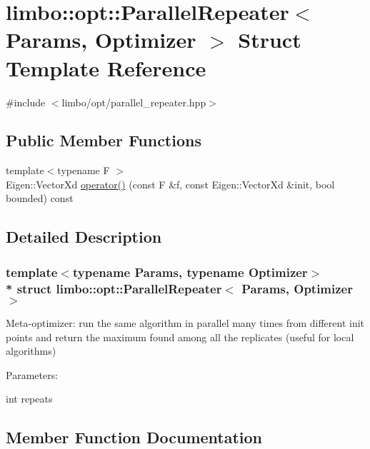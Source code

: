 \hypertarget{structlimbo_1_1opt_1_1_parallel_repeater}{}\section{limbo\+:\+:opt\+:\+:Parallel\+Repeater$<$ Params, Optimizer $>$ Struct Template Reference}
\label{structlimbo_1_1opt_1_1_parallel_repeater}


{\ttfamily \#include $<$limbo/opt/parallel\+\_\+repeater.\+hpp$>$}

\subsection*{Public Member Functions}
\begin{DoxyCompactItemize}
\item 
{\footnotesize template$<$typename F $>$ }\\Eigen\+::\+Vector\+Xd \hyperlink{structlimbo_1_1opt_1_1_parallel_repeater_ac50bb2fc1525495c2025f0ff1c0cb021}{operator()} (const F \&f, const Eigen\+::\+Vector\+Xd \&init, bool bounded) const 
\end{DoxyCompactItemize}


\subsection{Detailed Description}
\subsubsection*{template$<$typename Params, typename Optimizer$>$\\*
struct limbo\+::opt\+::\+Parallel\+Repeater$<$ Params, Optimizer $>$}

Meta-\/optimizer\+: run the same algorithm in parallel many times from different init points and return the maximum found among all the replicates (useful for local algorithms)

Parameters\+:
\begin{DoxyItemize}
\item int repeats 
\end{DoxyItemize}

\subsection{Member Function Documentation}
